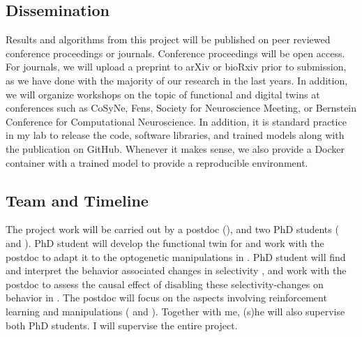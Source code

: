 \documentclass[B2,COG]{ercgrant}
\begin{document}
\subsection{Dissemination}
Results and algorithms from this project will be published on peer reviewed conference proceedings or journals. 
Conference proceedings will be open access.
For journals, we will upload a preprint to arXiv or bioRxiv prior to submission, as we have done with the majority of our research in the last years. 
In addition, we will organize workshops on the topic of functional and digital twins at conferences such as CoSyNe, Fens, Society for Neuroscience Meeting, or Bernstein Conference for Computational Neuroscience.
In addition, it is standard practice in my lab to release the code, software libraries, and trained models along with the publication on GitHub.
Whenever it makes sense, we also provide a Docker container with a trained model to provide a reproducible environment.

\subsection{Team and Timeline}
The project work will be carried out by a postdoc (), and two PhD students ( and ). 
PhD student  will develop the functional twin for  and work with the postdoc to adapt it to the optogenetic manipulations in .
PhD student  will find and interpret the behavior associated changes in selectivity , and work with the postdoc to assess the causal effect of disabling these selectivity-changes on behavior in .
The postdoc  will focus on the aspects involving reinforcement learning and manipulations ( and ). 
Together with me, (s)he will also supervise both PhD students.
I will supervise the entire project.
\end{document}
